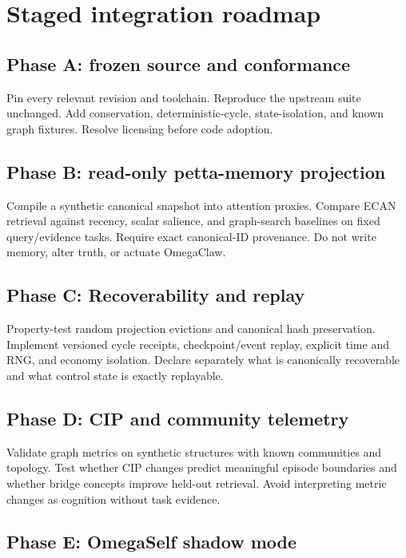 \documentclass[11pt]{article}
\begin{document}
\section{Staged integration roadmap}

\subsection{Phase A: frozen source and conformance}

Pin every relevant revision and toolchain.  Reproduce the upstream suite
unchanged.  Add conservation, deterministic-cycle, state-isolation, and known
graph fixtures.  Resolve licensing before code adoption.

\subsection{Phase B: read-only petta-memory projection}

Compile a synthetic canonical snapshot into attention proxies.  Compare ECAN
retrieval against recency, scalar salience, and graph-search baselines on fixed
query/evidence tasks.  Require exact canonical-ID provenance.  Do not write
memory, alter truth, or actuate OmegaClaw.

\subsection{Phase C: Recoverability and replay}

Property-test random projection evictions and canonical hash preservation.
Implement versioned cycle receipts, checkpoint/event replay, explicit time and
RNG, and economy isolation.  Declare separately what is canonically recoverable
and what control state is exactly replayable.

\subsection{Phase D: CIP and community telemetry}

Validate graph metrics on synthetic structures with known communities and
topology.  Test whether CIP changes predict meaningful episode boundaries and
whether bridge concepts improve held-out retrieval.  Avoid interpreting metric
changes as cognition without task evidence.

\subsection{Phase E: OmegaSelf shadow mode}
\end{document}
